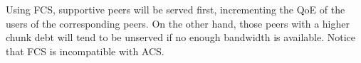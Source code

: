 Using FCS, supportive peers will be served first, incrementing the QoE
of the users of the corresponding peers. On the other hand, those
peers with a higher chunk debt will tend to be unserved if no enough
bandwidth is available. Notice that FCS is incompatible with ACS.

\begin{comment}
Notice that in this example, for the sake of simplicity, a simple
round-robing pending scheduler has been used.  Actually, DBS selects
the $\mathtt{pending}[]$ entries using the supportivity information
gathered from the neighbors. This information is stored in a
$\mathtt{supportivity}[]$ table, which is indexed by the neighbors
end-points. When the list of peers is received from the splitter, all
the peers have the same supportivity. These supportivity values are
incremented each time a chunk is received from the corresponding
neighbor and decremented each time a chunk is received form the
splitter (i.e., in each round). Thus, supportive neighbors will tend
to have a higher supportivity than unsupportive neighbors.
\end{comment}

\begin{comment}
To achieve this behavior, FCS defines that, if ${\cal P}^j_k$ realises
that $\mathtt{debt}[{\cal P}^j_l]>\mathtt{debt}_{\text{max}}$, then
${\cal P}^j_k$ removes ${\cal P}^j_l$ from ${\cal T}^j_k$. Obviously,
${\cal P}^j_l$ should churn, unless it not interested in playing the
media.

, where those peers with
a low chunk debt are selected first.  Debs are clipped to $\pm
D$. In ideal circunstances, debs should be $0$. Obviously, a high
supportivity means a low debt, and viceversa.

In DBS, the splitter sends to each peer of the team one chunk per
round. On the other hand, the peers can have a variable number of
neighbors. In this context, those peers with a higher degree of
connectivity will forward more chunks than the peers with a lower
degree. So, by definition, peers with a lower connectivity will
forward a lower number of chunks for those peers that it is the origin
peer. In the extreme case, a peer $P_x$ behind a NAT could be
connected only with one external peer $P_y$ which should forward to it
all the chunks except those that receive directly from the
splitter. Obviously, in this case, $\text{debt}[P_x]$ in $P_y$ will
reach $D$ fastly.

Peers will remove as neighbors those peers whose debt reaches $D$
during $D^*$ consecutive rounds.
\end{comment}

